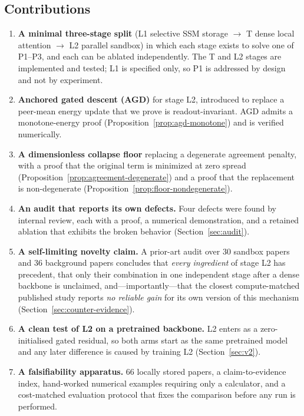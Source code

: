 \documentclass[11pt,a4paper]{article}
\theoremstyle{plain}
\theoremstyle{definition}
\theoremstyle{remark}
\begin{document}
\subsection{Contributions}

\begin{enumerate}
  \item \textbf{A minimal three-stage split} (L1 selective SSM storage $\to$
        T dense local attention $\to$ L2 parallel sandbox) in which each
        stage exists to solve one of P1--P3, and each can be ablated
        independently. The T and L2 stages are implemented and tested; L1 is
        specified only, so P1 is addressed by design and not by experiment.
  \item \textbf{Anchored gated descent (AGD)} for stage L2, introduced to
        replace a peer-mean energy update that we prove is
        readout-invariant. AGD admits a monotone-energy proof
        (Proposition~\ref{prop:agd-monotone}) and is verified numerically.
  \item \textbf{A dimensionless collapse floor} replacing a degenerate
        agreement penalty, with a proof that the original term is minimized
        at zero spread (Proposition~\ref{prop:agreement-degenerate}) and a
        proof that the replacement is non-degenerate
        (Proposition~\ref{prop:floor-nondegenerate}).
  \item \textbf{An audit that reports its own defects.} Four defects were
        found by internal review, each with a proof, a numerical
        demonstration, and a retained ablation that exhibits the broken
        behavior (Section~\ref{sec:audit}).
  \item \textbf{A self-limiting novelty claim.} A prior-art audit over 30
        sandbox papers and 36 background papers concludes that \emph{every
        ingredient} of stage L2 has precedent, that only their combination
        in one independent stage after a dense backbone is unclaimed,
        and---importantly---that the
        closest compute-matched published study reports \emph{no reliable
        gain} for its own version of this mechanism
        (Section~\ref{sec:counter-evidence}).
  \item \textbf{A clean test of L2 on a pretrained backbone.} L2 enters
        as a zero-initialised gated residual, so both arms start as the same
        pretrained model and any later difference is caused by training L2
        (Section~\ref{sec:v2}).
  \item \textbf{A falsifiability apparatus.} 66 locally stored papers, a
        claim-to-evidence index, hand-worked numerical examples requiring only
        a calculator, and a cost-matched evaluation protocol that fixes the
        comparison before any run is performed.
\end{enumerate}
\end{document}
